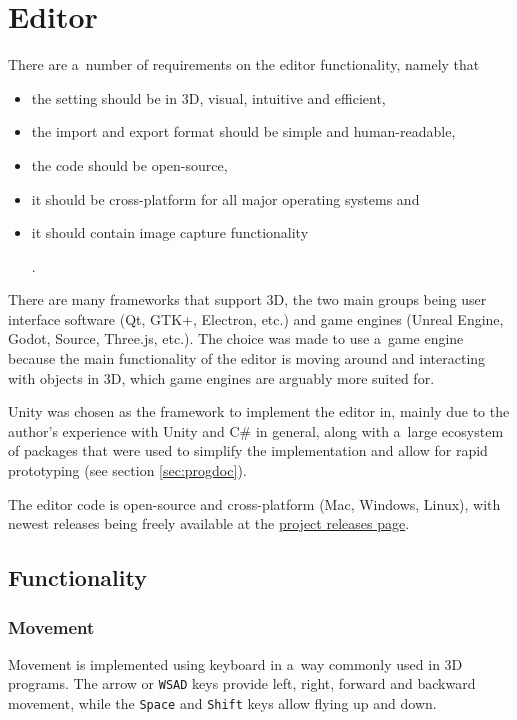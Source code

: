 \chapter{Editor}\label{sec:editor}
There are a~number of requirements on the editor functionality, namely that
\begin{itemize}
	\item the setting should be in 3D, visual, intuitive and efficient,
	\item the import and export format should be simple and human-readable,
	\item the code should be open-source,
	\item it should be cross-platform for all major operating systems and
	\item it should contain image capture functionality.
\end{itemize}

There are many frameworks that support 3D, the two main groups being user interface software (Qt, GTK+, Electron, etc.) and game engines (Unreal Engine, Godot, Source, Three.js, etc.).
The choice was made to use a~game engine because the main functionality of the editor is moving around and interacting with objects in 3D, which game engines are arguably more suited for.

Unity was chosen as the framework to implement the editor in, mainly due to the author's experience with Unity and C\# in general, along with a~large ecosystem of packages that were used to simplify the implementation and allow for rapid prototyping (see section \ref{sec:progdoc}).

The editor code is open-source and cross-platform (Mac, Windows, Linux), with newest releases being freely available at the \href{https://github.com/Climber-Tools/Cled/releases}{project releases page}.

\section{Functionality}

\subsection{Movement}
Movement is implemented using keyboard in a~way commonly used in 3D programs.
The arrow or \verb|WSAD| keys provide left, right, forward and backward movement, while the \verb|Space| and \verb|Shift| keys allow flying up and down.

